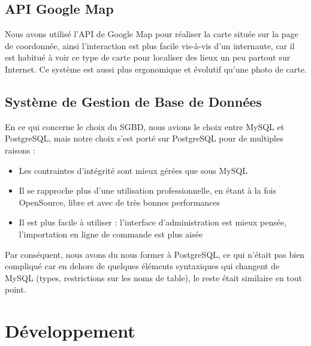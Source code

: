 \documentclass[11pt]{report}
\begin{document}
\subsection{API Google Map}
Nous avons utilisé l'API de Google Map pour réaliser la carte située sur la page
de coordonnée, ainsi l'interaction est plus facile vis-à-vis d'un internaute,
car il est habitué à voir ce type de carte pour localiser des lieux un peu
partout sur Internet. Ce système est aussi plus ergonomique et évolutif qu'une
photo de carte.

\subsection{Système de Gestion de Base de Données}
En ce qui concerne le choix du SGBD, nous avions le choix entre MySQL et
PostgreSQL, mais notre choix s'est porté sur PostgreSQL pour de multiples
raisons : \\
\begin{itemize}
  \item Les contraintes d'intégrité sont mieux gérées que sous MySQL
  \item Il se rapproche plus d'une utilisation professionnelle, en étant à la
  fois OpenSource, libre et avec de très bonnes performances
  \item Il est plus facile à utiliser : l'interface d'administration est mieux
  pensée, l'importation en ligne de commande est plus aisée \\
\end{itemize}

\par Par conséquent, nous avons du nous former à PostgreSQL, ce qui n'était pas
bien compliqué car en dehors de quelques éléments syntaxiques qui changent de
MySQL (types, restrictions sur les noms de table), le reste était similaire en 
tout point.

\section{Développement}
\end{document}

